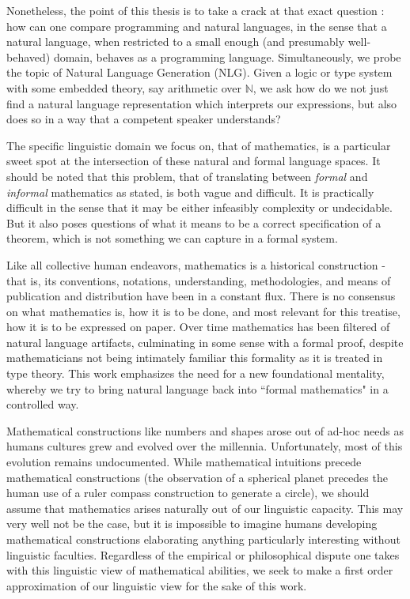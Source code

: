 Nonetheless, the point of this thesis is to take a crack at that exact question
: how can one compare programming and natural languages, in the sense that a
natural language, when restricted to a small enough (and presumably
well-behaved) domain, behaves as a programming language. Simultaneously, we
probe the topic of Natural Language Generation (NLG). Given a logic or type
system with some embedded theory, say arithmetic over $\mathbb{N}$, we ask how
do we not just find a natural language representation which interprets our
expressions, but also does so in a way that a competent speaker understands?

The specific linguistic domain we focus on, that of mathematics, is a particular
sweet spot at the intersection of these natural and formal language spaces. It
should be noted that this problem, that of translating between \emph{formal} and
\emph{informal} mathematics as stated, is both vague and difficult. It is
practically difficult in the sense that it may be either infeasibly
complexity or undecidable. But it also poses questions of what it means to be a
correct specification of a theorem, which is not something we can capture in a
formal system.

Like all collective human endeavors, mathematics is a historical construction -
that is, its conventions, notations, understanding, methodologies, and means of
publication and distribution have been in a constant flux. There is no consensus
on what mathematics is, how it is to be done, and most relevant for this
treatise, how it is to be expressed on paper. Over time mathematics has been
filtered of natural language artifacts, culminating in some sense with a formal
proof, despite mathematicians not being intimately familiar this formality as it
is treated in type theory. This work emphasizes the need for a new foundational
mentality, whereby we try to bring natural language back into ``formal
mathematics" in a controlled way.

Mathematical constructions like numbers and shapes arose out of ad-hoc needs as
humans cultures grew and evolved over the millennia. Unfortunately, most of this
evolution remains undocumented. While mathematical intuitions precede
mathematical constructions (the observation of a spherical planet precedes the
human use of a ruler compass construction to generate a circle), we should
assume that mathematics arises naturally out of our linguistic capacity. This
may very well not be the case, but it is impossible to imagine humans developing
mathematical constructions elaborating anything particularly interesting without
linguistic faculties. Regardless of the empirical or philosophical dispute one
takes with this linguistic view of mathematical abilities, we seek to make a
first order approximation of our linguistic view for the sake of this work.

